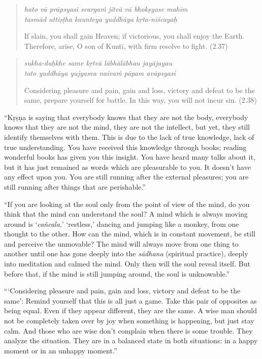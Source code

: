 \documentclass[12pt, twoside, openright]{memoir}
\begin{document}
\par
\begin{verse}
\textit{hato vā prāpsyasi svargaṁ jitvā vā bhokṣyase mahīm} \\
\textit{tasmād uttiṣṭha kaunteya yuddhāya kṛta-niścayaḥ}

\noindent If slain, you shall gain Heaven; if victorious, you shall enjoy the Earth. Therefore, arise, O son of Kuntī, with firm resolve to fight. (2.37)
\end{verse}
\par



\par
\begin{verse}
\textit{sukha-duḥkhe same kṛtvā lābhālābhau jayājayau} \\
\textit{tato yuddhāya yujyasva naivaṁ pāpam avāpsyasi}

\noindent Considering pleasure and pain, gain and loss, victory and defeat to be the same, prepare yourself for battle. In this way, you will not incur sin. (2.38)
\end{verse}
\par


\enquote{Kṛṣṇa is saying that everybody knows that they are not the body, everybody knows that they are not the mind, they are not the intellect, but yet, they still identify themselves with them. This is due to the lack of true knowledge, lack of true understanding. You have received this knowledge through books; reading wonderful books has given you this insight. You have heard many talks about it, but it has just remained as words which are pleasurable to you. It doesn’t have any effect upon you. You are still running after the external pleasures; you are still running after things that are perishable.}

\enquote{If you are looking at the soul only from the point of view of the mind, do you think that the mind can understand the soul? A mind which is always moving around is \enquote{\textit{cañcala},} \enquote{restless,} dancing and jumping like a monkey, from one thought to the other. How can the mind, which is in constant movement, be still and perceive the unmovable? The mind will always move from one thing to another until one has gone deeply into the \textit{sādhana} (spiritual practice), deeply into meditation and calmed the mind. Only then will the soul reveal itself. But before that, if the mind is still jumping around, the soul is unknowable.}

\enquote{\enquote{Considering pleasure and pain, gain and loss, victory and defeat to be the same}: Remind yourself that this is all just a game. Take this pair of opposites as being equal. Even if they appear different, they are the same. A wise man should not be completely taken over by joy when something is happening, but just stay calm. And those who are wise don’t complain when there is some trouble. They analyze the situation. They are in a balanced state in both situations: in a happy moment or in an unhappy moment.}
\end{document}
